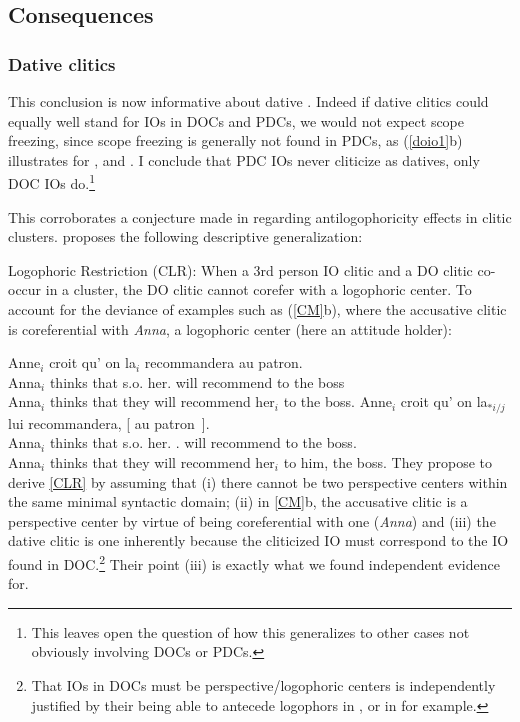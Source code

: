 \documentclass[output=paper]{langsci/langscibook}
\begin{document}
\subsection{Consequences}

\subsubsection{Dative clitics}

This conclusion is now informative about dative . Indeed if dative
clitics could equally well stand for \glspl{IO} in \glspl{DOC} and \glspl{PDC},
we would not expect scope freezing, since scope freezing is generally not found
in \glspl{PDC}, as (\ref{doio1}b) illustrates for , and . I
conclude that \gls{PDC} \glspl{IO} never cliticize as datives, only \gls{DOC}
\glspl{IO} do.\footnote{This leaves open the question of how this generalizes
to other cases not obviously involving \glspl{DOC} or \glspl{PDC}.}

This corroborates a conjecture made in \cite{Charnavel2015} regarding
antilogophoricity effects in clitic clusters. \cite{Charnavel2015} proposes the
following descriptive generalization:

\ea \label{CLR} Logophoric Restriction (CLR): When a 3rd person IO clitic and a DO clitic co-occur in a cluster, the DO clitic cannot corefer
with a logophoric center.
\z
%
To account for the deviance of examples such as (\ref{CM}b), where the
accusative clitic is coreferential with {\it Anna}, a logophoric center (here
an attitude holder):

\ea \label{CM} \ea
	\gll Anne$_i$ croit qu' on  la$_i$ recommandera au patron.\\
        Anna$_i$ thinks that s.o. her.\Acc{} {will recommend} {to the} boss \\
    \trans Anna$_i$ thinks that they will recommend her$_i$ to the boss.
    \ex
	\gll  Anne$_i$ croit qu' on la$_{*i/j}$ lui recommandera, [ au patron~].\\
    Anna$_i$ thinks that s.o. her.\Acc{} \Third.\Dat{} {will recommend} {} {to the} boss.\\
    \trans Anna$_i$ thinks that they will recommend her$_i$ to him, the boss.
\z
\z
%
They propose to derive \eqref{CLR} by assuming that (i) there cannot be two
perspective centers within the same minimal syntactic domain; (ii) in
\eqref{CM}b, the accusative clitic is a perspective center by virtue of being
coreferential with one ({\it Anna}) and (iii) the dative clitic is one
inherently because the cliticized IO must correspond to the IO found in
DOC.\footnote{That \glspl{IO} in \glspl{DOC} must be perspective/logophoric
    centers is independently justified by their being able to antecede
    logophors in , or in  for example.} Their point (iii) is
    exactly what we found independent evidence for.
\end{document}
